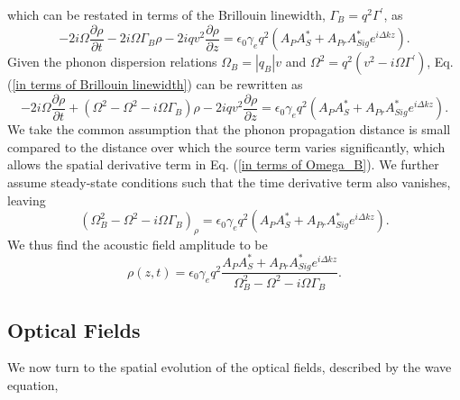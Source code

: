\documentclass[sn-nature]{sn-jnl}%
\begin{document}
which can be restated in terms of the Brillouin linewidth, $\Gamma_{B} = q^{2}\Gamma^{\prime}$, as
\begin{equation}
    -2i\Omega\frac{\partial\rho}{\partial t} - 2i\Omega\Gamma_{B}\rho - 2iqv^{2}\frac{\partial\rho}{\partial z} = \epsilon_{0}\gamma_{e}q^{2}(A_{P}A_{S}^{*} + A_{Pr}A_{Sig}^{*}e^{i\Delta kz}).
    \label{in terms of Brillouin linewidth}
\end{equation}
Given the phonon dispersion relations $\Omega_{B} = |q_{B}|v$ and $\Omega^{2} = q^{2}\left(v^{2} - i\Omega\Gamma^{\prime}\right)$, Eq. (\ref{in terms of Brillouin linewidth}) can be rewritten as
\begin{equation}
    -2i\Omega\frac{\partial\rho}{\partial t} + \left(\Omega^{2} - \Omega^{2} - i\Omega\Gamma_{B}\right)\rho - 2iqv^{2}\frac{\partial\rho}{\partial z} = \epsilon_{0}\gamma_{e}q^{2}(A_{P}A_{S}^{*} + A_{Pr}A_{Sig}^{*}e^{i\Delta kz}).
    \label{in terms of Omega_B}
\end{equation}
We take the common assumption that the phonon propagation distance is small compared to the distance over which the source term varies significantly, which allows the spatial derivative term in Eq. (\ref{in terms of Omega_B}). We further assume steady-state conditions such that the time derivative term also vanishes, leaving
\begin{equation}
    (\Omega^{2}_{B} - \Omega^{2} - i\Omega\Gamma_{B})_{\rho} = \epsilon_{0}\gamma_{e}q^{2}(A_{P}A_{S}^{*} + A_{Pr}A_{Sig}^{*}e^{i\Delta kz}).
\end{equation}
We thus find the acoustic field amplitude to be
\begin{equation}
    \rho(z,t) = \epsilon_{0}\gamma_{e}q^{2}\frac{A_{P}A_{S}^{*} + A_{Pr}A_{Sig}^{*}e^{i\Delta kz}}{\Omega_{B}^{2} - \Omega^{2} - i\Omega\Gamma_{B}}.
    \label{Acoustic field amplitude}
\end{equation}
\subsection{Optical Fields}
We now turn to the spatial evolution of the optical fields, described by the wave equation,
\end{document}

